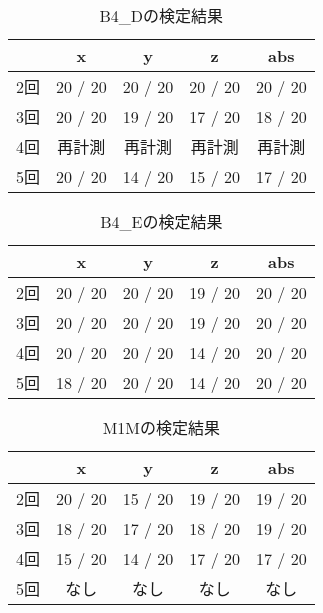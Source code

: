 \begin{table}[tb]
    \caption{B4_Dの検定結果}
    \vspace{0.5cm}
    \centering
    \begin{tabular}{|c|c|c|c|c|}
        \hline
        \diagbox{}{} & x & y & z & abs \\\hline
        2回 & 20 / 20 & 20 / 20 & 20 / 20 & 20 / 20 \\
        3回 & 20 / 20 & 19 / 20 & 17 / 20 & 18 / 20 \\
        4回 & 再計測 & 再計測 & 再計測 & 再計測 \\
        5回 & 20 / 20 & 14 / 20 & 15 / 20 & 17 / 20 \\
        \hline
    \end{tabular}
\end{table}
\begin{table}[tb]
    \caption{B4_Eの検定結果}
    \vspace{0.5cm}
    \centering
    \begin{tabular}{|c|c|c|c|c|}
        \hline
        \diagbox{}{} & x & y & z & abs \\\hline
        2回 & 20 / 20 & 20 / 20 & 19 / 20 & 20 / 20 \\
        3回 & 20 / 20 & 20 / 20 & 19 / 20 & 20 / 20 \\
        4回 & 20 / 20 & 20 / 20 & 14 / 20 & 20 / 20 \\
        5回 & 18 / 20 & 20 / 20 & 14 / 20 & 20 / 20 \\
        \hline
    \end{tabular}
\end{table}
\begin{table}[tb]
    \caption{M1Mの検定結果}
    \vspace{0.5cm}
    \centering
    \begin{tabular}{|c|c|c|c|c|}
        \hline
        \diagbox{}{} & x & y & z & abs \\\hline
        2回 & 20 / 20 & 15 / 20 & 19 / 20 & 19 / 20 \\
        3回 & 18 / 20 & 17 / 20 & 18 / 20 & 19 / 20 \\
        4回 & 15 / 20 & 14 / 20 & 17 / 20 & 17 / 20 \\
        5回 & なし & なし & なし & なし \\
        \hline
    \end{tabular}
\end{table}
